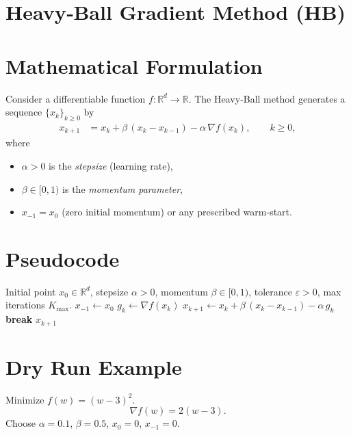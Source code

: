 \documentclass{article}
\newcommand{\norm}[1]{\left\lVert#1\right\rVert}
\newcommand{\R}{\mathbb{R}}
\begin{document}
\section*{Heavy‑Ball Gradient Method (HB)}

\section*{Mathematical Formulation}
Consider a differentiable function $f:\R^{d}\rightarrow\R$.
The Heavy‑Ball method generates a sequence $\{x_k\}_{k\ge 0}$ by
\[
\boxed{
\begin{aligned}
x_{k+1}&=x_k+\beta\,(x_k-x_{k-1})-\alpha\,\nabla f(x_k),\qquad k\ge 0,
\end{aligned}}
\tag{HB}
\]
where  

\begin{itemize}
\item $\alpha>0$ is the \emph{stepsize} (learning rate),
\item $\beta\in[0,1)$ is the \emph{momentum parameter},
\item $x_{-1}=x_0$ (zero initial momentum) or any prescribed warm‑start.
\end{itemize}

\section*{Pseudocode}
\begin{algorithm}[H]
\caption{Heavy‑Ball Gradient Method}
\begin{algorithmic}[1]
\Require Initial point $x_0\in\R^{d}$, stepsize $\alpha>0$, momentum $\beta\in[0,1)$,
        tolerance $\varepsilon>0$, max iterations $K_{\max}$.
\State $x_{-1}\gets x_0$ 
    \State $g_k\gets \nabla f(x_k)$
    \State $x_{k+1}\gets x_k+\beta\,(x_k-x_{k-1})-\alpha\,g_k$
    \If{$\norm{g_k}\le \varepsilon$}
        \State \textbf{break}
    \EndIf
\EndFor
\State \Return $x_{k+1}$
\end{algorithmic}
\end{algorithm}

\section*{Dry Run Example}
Minimize $f(w)=(w-3)^2$.
\[
\nabla f(w)=2(w-3).
\]
Choose $\alpha=0.1$, $\beta=0.5$, $x_{0}=0$, $x_{-1}=0$.
\end{document}
